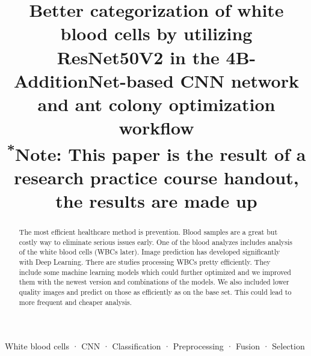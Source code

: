 \documentclass[conference]{IEEEtran}
\begin{document}
\title{Better categorization of white blood cells by utilizing ResNet50V2 in the
4B-AdditionNet-based CNN network and ant colony optimization workflow\\
{\footnotesize \textsuperscript{*}Note: This paper is the result of a research practice course handout, the results are made up}
}

\author{
\and
{}
\and
{}
\and
{}
}

\maketitle

\begin{abstract}
The most efficient healthcare method is prevention. Blood samples are a great but costly way to eliminate serious issues early. One of the blood analyzes includes analysis of the white blood cells (WBCs later). Image prediction has developed significantly with Deep Learning. There are studies processing WBCs pretty efficiently. They include some machine learning models which could further optimized and we improved them with the newest version and combinations of the models. We also included lower quality images and predict on those as efficiently as on the base set. This could lead to more frequent and cheaper analysis.
\end{abstract}

\begin{IEEEkeywords}
White blood cells · CNN · Classification · Preprocessing · Fusion · Selection
\end{IEEEkeywords}
\end{document}
